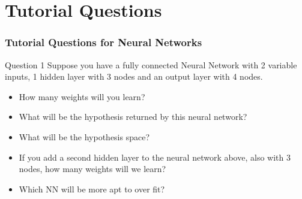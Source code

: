 \documentclass[aspectratio=169, 10pt]{beamer}
\begin{document}
\section{Tutorial Questions}
\begin{frame}
    \frametitle{Tutorial Questions for Neural Networks}

    \begin{block}{Question 1}
        Suppose you have a fully connected Neural Network with 2 variable inputs, 1 hidden layer with 3 nodes and an output layer with 4 nodes.
    \end{block}

    \begin{itemize}
        \item How many weights will you learn? 
        \item What will be the hypothesis returned by this neural network? 
        \item What will be the hypothesis space? 
        \item If you add a second hidden layer to the neural network above, also with 3 nodes, how many weights will we learn? 
        \item Which NN will be more apt to over fit? 
    \end{itemize}
\end{frame}
\end{document}

